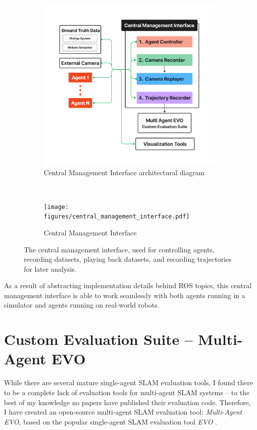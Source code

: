 \begin{figure}[h]
    \centering
    \begin{subfigure}[t]{0.425\textwidth}
        \centering
        \includegraphics[trim=5cm 0cm 5cm 5cm, width=\linewidth]{figures/central_management_interface_diagram.pdf}
        \caption{Central Management Interface architectural diagram}
    \end{subfigure}\hfill%
    ~
    \begin{subfigure}[t]{0.5\textwidth}
        \centering
        \texttt{[image: figures/central\_management\_interface.pdf]}
        \caption{Central Management Interface}
    \end{subfigure}%

    \caption{The central management interface, used for controlling agents, recording datasets, playing back datasets, and recording trajectories for later analysis.}
    \label{fig:central-management-interface}
\end{figure}

As a result of abstracting implementation details behind ROS topics, this central management interface is able to work seamlessly with both agents running in a simulator and agents running on real-world robots.

\section{Custom Evaluation Suite – Multi-Agent EVO}
\label{sec:multi-agent-evo}
While there are several mature single-agent SLAM evaluation tools, I found there to be a complete lack of evaluation tools for multi-agent SLAM systems – to the best of my knowledge no papers have published their evaluation code. Therefore, I have created an open-source multi-agent SLAM evaluation tool: \textit{Multi-Agent EVO}, based on the popular single-agent SLAM evaluation tool \textit{EVO} \autocite{grupp2017evo}.

